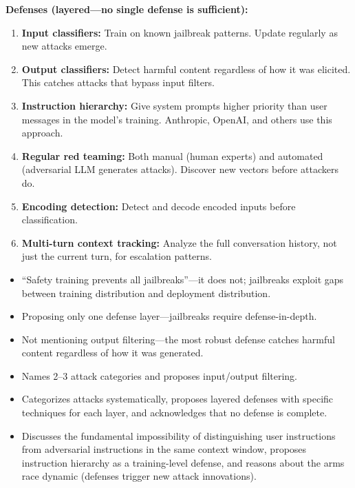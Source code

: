 \begin{interviewq}
\textbf{Defenses (layered---no single defense is sufficient):}
\begin{enumerate}
    \item \textbf{Input classifiers:} Train on known jailbreak patterns. Update regularly as new attacks emerge.
    \item \textbf{Output classifiers:} Detect harmful content regardless of how it was elicited. This catches attacks that bypass input filters.
    \item \textbf{Instruction hierarchy:} Give system prompts higher priority than user messages in the model's training. Anthropic, OpenAI, and others use this approach.
    \item \textbf{Regular red teaming:} Both manual (human experts) and automated (adversarial LLM generates attacks). Discover new vectors before attackers do.
    \item \textbf{Encoding detection:} Detect and decode encoded inputs before classification.
    \item \textbf{Multi-turn context tracking:} Analyze the full conversation history, not just the current turn, for escalation patterns.
\end{enumerate}

\redflags
\begin{itemize}
    \item ``Safety training prevents all jailbreaks''---it does not; jailbreaks exploit gaps between training distribution and deployment distribution.
    \item Proposing only one defense layer---jailbreaks require defense-in-depth.
    \item Not mentioning output filtering---the most robust defense catches harmful content regardless of how it was generated.
\end{itemize}


\goodgreat
\begin{itemize}
    \item {} Names 2--3 attack categories and proposes input/output filtering.
    \item {} Categorizes attacks systematically, proposes layered defenses with specific techniques for each layer, and acknowledges that no defense is complete.
    \item {} Discusses the fundamental impossibility of distinguishing user instructions from adversarial instructions in the same context window, proposes instruction hierarchy as a training-level defense, and reasons about the arms race dynamic (defenses trigger new attack innovations).
\end{itemize}

\end{interviewq}

